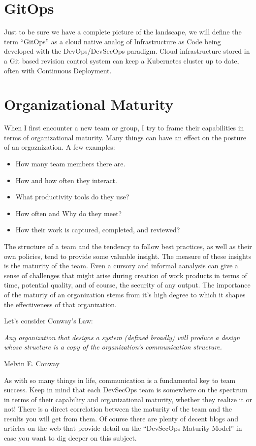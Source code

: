 \section{GitOps}

\justifying
Just to be sure we have a complete picture of the landscape, we will define the term ``GitOps'' as a
cloud native analog of Infrastructure as Code being developed with the DevOps/DevSecOps paradigm. Cloud infrastructure
stored in a Git based revision control system can keep a Kubernetes cluster up to date, often with Continuous Deployment.

\section{Organizational Maturity}

\justifying
When I first encounter a new team or group, I try to frame their capabilities in terms of organizational maturity.
Many things can have an effect on the posture of an orgaznization. A few examples:

\begin{itemize}
	\item How many team members there are.
	\item How and how often they interact.
	\item  What productivity tools do they use?
	\item How often and Why do they meet?
	\item How their work is captured, completed, and reviewed?
\end{itemize}

The structure of a team and the tendency to follow best practices, as well as their own policies, tend to provide some
valuable insight. The measure of these insights is the maturity of the team. Even a cursory and informal aanalysis can give
a sense of challenges that might arise during creation of work products in terms of time, potential quality, and of course,
the security of any output. The importance of the maturiy of an organization stems from it's high degree to which it shapes
the effectiveness of that organization.

\justifying
Let's consider Conway's Law:

\begin{displayquote}
    \emph{Any organization that designs a system (defined broadly) will produce a design whose structure is a copy of the
organization's communication structure.}

Melvin E. Conway
\end{displayquote}

\justifying
As with so many things in life, communication is a fundamental key to team success. Keep in mind that each DevSecOps
team is somewhere on the spectrum in terms of their capability and organizational maturity, whether they realize it or not!
There is a direct correlation between the maturity of the team and the results you will get from them. Of course there are
plenty of decent blogs and articles on the web that provide detail on the ``DevSecOps Maturity Model'' in case you want to
dig deeper on this subject.
